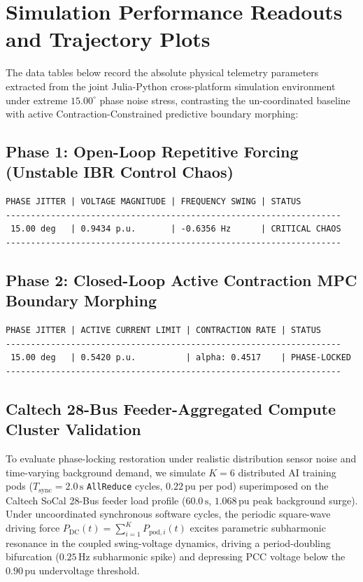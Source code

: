 \documentclass[11pt,fleqn]{article}
\begin{document}
\section{Simulation Performance Readouts and Trajectory Plots}
The data tables below record the absolute physical telemetry parameters extracted from the joint Julia-Python cross-platform simulation environment under extreme $15.00^\circ$ phase noise stress, contrasting the un-coordinated baseline with active Contraction-Constrained predictive boundary morphing:

\subsection{Phase 1: Open-Loop Repetitive Forcing (Unstable IBR Control Chaos)}
\begin{verbatim}
PHASE JITTER | VOLTAGE MAGNITUDE | FREQUENCY SWING | STATUS
-------------------------------------------------------------------
 15.00 deg   | 0.9434 p.u.       | -0.6356 Hz      | CRITICAL CHAOS
-------------------------------------------------------------------
\end{verbatim}

\subsection{Phase 2: Closed-Loop Active Contraction MPC Boundary Morphing}
\begin{verbatim}
PHASE JITTER | ACTIVE CURRENT LIMIT | CONTRACTION RATE | STATUS
-------------------------------------------------------------------
 15.00 deg   | 0.5420 p.u.          | alpha: 0.4517    | PHASE-LOCKED
-------------------------------------------------------------------
\end{verbatim}
\subsection{Caltech 28-Bus Feeder-Aggregated Compute Cluster Validation}
To evaluate phase-locking restoration under realistic distribution sensor noise and time-varying background demand, we simulate $K=6$ distributed AI training pods ($T_{\mathrm{sync}} = 2.0\,\mathrm{s}$ \texttt{AllReduce} cycles, $0.22\,\mathrm{pu}$ per pod) superimposed on the Caltech SoCal 28-Bus feeder load profile ($60.0\,\mathrm{s}$, $1.068\,\mathrm{pu}$ peak background surge). Under uncoordinated synchronous software cycles, the periodic square-wave driving force $P_{\mathrm{DC}}(t) = \sum_{i=1}^{K} P_{\mathrm{pod},i}(t)$ excites parametric subharmonic resonance in the coupled swing-voltage dynamics, driving a period-doubling bifurcation ($0.25\,\mathrm{Hz}$ subharmonic spike) and depressing PCC voltage below the $0.90\,\mathrm{pu}$ undervoltage threshold.
\end{document}
